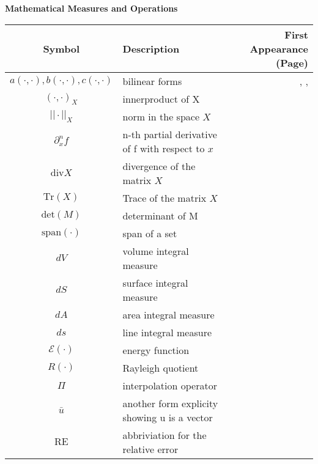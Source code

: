 \documentclass[main.tex]{subfiles}
\begin{document}
\noindent
\textbf{Mathematical Measures and Operations}\\
\begin{tabularx}{\textwidth}{cXr}
\toprule
Symbol & Description & First Appearance (Page) \\ 
\midrule
\( a(\cdot,\cdot), b(\cdot,\cdot), c(\cdot,\cdot) \) & bilinear forms & \pageref{sym:a}, \pageref{sym:b}, \pageref{sym:c} \\
\( (\cdot, \cdot)_X \) & innerproduct of X & \pageref{sym:innerproduct} \\
\( ||\cdot||_X \) & norm in the space \( X \) & \pageref{sym:norm} \\
\( \partial_x^nf \) & n-th partial derivative of f with respect to \( x \) & \pageref{sym:partial_diff} \\
\( \textrm{div} X \) & divergence of the matrix \( X \) & \pageref{sym:divT} \\
\( \textrm{Tr}(X) \) & Trace of the matrix \( X \) & \pageref{sym:TrT} \\
\( \textrm{det}(M) \) & determinant of M & \pageref{sym:determinant} \\
\( \textrm{span}(\cdot) \) & span of a set & \pageref{sym:span} \\
\( dV \) & volume integral measure & \pageref{sym:dV} \\
\( dS \) & surface integral measure & \pageref{sym:dS} \\
\( dA \) & area integral measure & \pageref{sym:dA} \\
\( ds \) & line integral measure & \pageref{sym:ds} \\
\( \mathcal{E}(\cdot) \) & energy function & \pageref{sym:Energy} \\
\( R(\cdot) \) & Rayleigh quotient & \pageref{sym:Rayleigh} \\
\( \Pi \) & interpolation operator & \pageref{sym:interpolation} \\
\( \bar{u} \) & another form explicity showing u is a vector & \pageref{sym:baru} \\
\( \textrm{RE} \) & abbriviation for the relative error & \pageref{sym:RE} \\
\bottomrule
\end{tabularx}
\end{document}
